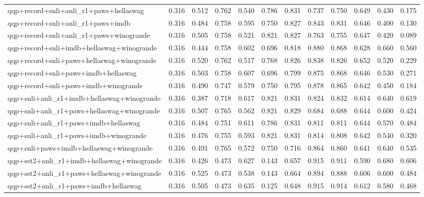 \begin{table}[t]
\begin{tabular}{lrrrrrrrrrrr}
    qqp+record+snli+anli\_r1+paws+hellaswag & 0.316 & 0.512 & 0.762 & 0.540 & 0.786 & 0.831 & 0.737 & 0.750 & 0.649 & 0.430 & 0.175 \\
    qqp+record+snli+anli\_r1+paws+imdb & 0.316 & 0.484 & 0.758 & 0.595 & 0.750 & 0.827 & 0.843 & 0.831 & 0.646 & 0.400 & 0.130 \\
    qqp+record+snli+anli\_r1+paws+winogrande & 0.316 & 0.505 & 0.758 & 0.521 & 0.821 & 0.827 & 0.763 & 0.755 & 0.647 & 0.420 & 0.089 \\
    qqp+record+snli+imdb+hellaswag+winogrande & 0.316 & 0.444 & 0.758 & 0.602 & 0.696 & 0.818 & 0.880 & 0.868 & 0.628 & 0.660 & 0.560 \\
    qqp+record+snli+paws+hellaswag+winogrande & 0.316 & 0.520 & 0.762 & 0.517 & 0.768 & 0.826 & 0.838 & 0.826 & 0.652 & 0.520 & 0.229 \\
    qqp+record+snli+paws+imdb+hellaswag & 0.316 & 0.503 & 0.758 & 0.607 & 0.696 & 0.799 & 0.875 & 0.868 & 0.646 & 0.530 & 0.271 \\
    qqp+record+snli+paws+imdb+winogrande & 0.316 & 0.490 & 0.747 & 0.579 & 0.750 & 0.795 & 0.878 & 0.865 & 0.642 & 0.450 & 0.184 \\
    qqp+snli+anli\_r1+imdb+hellaswag+winogrande & 0.316 & 0.387 & 0.718 & 0.617 & 0.821 & 0.831 & 0.824 & 0.832 & 0.614 & 0.640 & 0.619 \\
    qqp+snli+anli\_r1+paws+hellaswag+winogrande & 0.316 & 0.507 & 0.765 & 0.562 & 0.821 & 0.829 & 0.684 & 0.688 & 0.644 & 0.600 & 0.424 \\
    qqp+snli+anli\_r1+paws+imdb+hellaswag & 0.316 & 0.484 & 0.751 & 0.611 & 0.786 & 0.831 & 0.811 & 0.811 & 0.644 & 0.570 & 0.484 \\
    qqp+snli+anli\_r1+paws+imdb+winogrande & 0.316 & 0.476 & 0.755 & 0.593 & 0.821 & 0.831 & 0.814 & 0.808 & 0.642 & 0.540 & 0.320 \\
    qqp+snli+paws+imdb+hellaswag+winogrande & 0.316 & 0.491 & 0.765 & 0.572 & 0.750 & 0.716 & 0.864 & 0.860 & 0.641 & 0.640 & 0.535 \\
    qqp+sst2+anli\_r1+imdb+hellaswag+winogrande & 0.316 & 0.426 & 0.473 & 0.627 & 0.143 & 0.657 & 0.915 & 0.911 & 0.590 & 0.680 & 0.606 \\
    qqp+sst2+anli\_r1+paws+hellaswag+winogrande & 0.316 & 0.525 & 0.473 & 0.538 & 0.143 & 0.664 & 0.894 & 0.888 & 0.606 & 0.600 & 0.484 \\
    qqp+sst2+anli\_r1+paws+imdb+hellaswag & 0.316 & 0.505 & 0.473 & 0.635 & 0.125 & 0.648 & 0.915 & 0.914 & 0.612 & 0.580 & 0.468 \\

\end{tabular}
\end{table}
